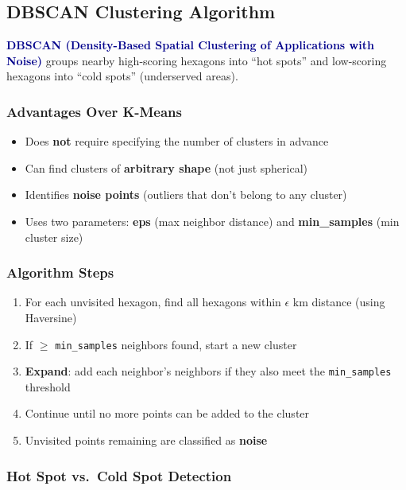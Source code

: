 \documentclass[12pt, a4paper]{article}
\newcommand{\concept}[1]{\textbf{\textcolor{darkblue}{#1}}}
\begin{document}
\subsection{DBSCAN Clustering Algorithm}

\concept{DBSCAN (Density-Based Spatial Clustering of Applications with Noise)}
groups nearby high-scoring hexagons into ``hot spots'' and low-scoring hexagons
into ``cold spots'' (underserved areas).

\subsubsection{Advantages Over K-Means}

\begin{itemize}[leftmargin=2em]
    \item Does \textbf{not} require specifying the number of clusters in advance
    \item Can find clusters of \textbf{arbitrary shape} (not just spherical)
    \item Identifies \textbf{noise points} (outliers that don't belong to any cluster)
    \item Uses two parameters: \textbf{eps} (max neighbor distance) and \textbf{min\_samples} (min cluster size)
\end{itemize}

\subsubsection{Algorithm Steps}

\begin{enumerate}[leftmargin=2em]
    \item For each unvisited hexagon, find all hexagons within $\epsilon$ km distance (using Haversine)
    \item If $\geq$ \texttt{min\_samples} neighbors found, start a new cluster
    \item \textbf{Expand}: add each neighbor's neighbors if they also meet the \texttt{min\_samples} threshold
    \item Continue until no more points can be added to the cluster
    \item Unvisited points remaining are classified as \textbf{noise}
\end{enumerate}

\subsubsection{Hot Spot vs.\ Cold Spot Detection}
\end{document}
